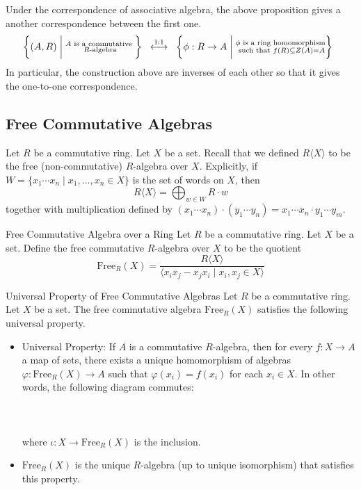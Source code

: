 \documentclass[a4paper]{article}
\begin{document}
Under the correspondence of associative algebra, the above proposition gives a another correspondence between the first one. $$\left\{(A,R)\;\bigg{|}\;\substack{A\text{ is a commutative }\\R\text{-algebra}}\right\}\;\;\overset{1:1}{\longleftrightarrow}\;\;\left\{\phi:R\to A\;\bigg{|}\;\substack{\phi\text{ is a ring homomorphism}\\\text{ such that }f(R)\subseteq Z(A)=A}\right\}\;\;$$ In particular, the construction above are inverses of each other so that it gives the one-to-one correspondence. 

\subsection{Free Commutative Algebras}
Let $R$ be a commutative ring. Let $X$ be a set. Recall that we defined $R\langle X\rangle$ to be the free (non-commutative) $R$-algebra over $X$. Explicitly, if $W=\{x_1\cdots x_n\;|\;x_1,\dots,x_n\in X\}$ is the set of words on $X$, then $$R\langle X\rangle=\bigoplus_{w\in W}R\cdot w$$ together with multiplication defined by $(x_1\cdots x_n)\cdot(y_1\cdots y_n)=x_1\cdots x_n\cdot y_1\cdots y_m$. 

\begin{defn}{Free Commutative Algebra over a Ring}{} Let $R$ be a commutative ring. Let $X$ be a set. Define the free commutative $R$-algebra over $X$ to be the quotient $$\text{Free}_R(X)=\frac{R\langle X\rangle}{\langle x_ix_j-x_jx_i\;|\;x_i,x_j\in X\rangle}$$
\end{defn}

\begin{prp}{Universal Property of Free Commutative Algebras}{} Let $R$ be a commutative ring. Let $X$ be a set. The free commutative algebra $\text{Free}_R(X)$ satisfies the following universal property. 
\begin{itemize}
\item Universal Property: If $A$ is a commutative $R$-algebra, then for every $f:X\to A$ a map of sets, there exists a unique homomorphism of algebras $\varphi:\text{Free}_R(X)\to A$ such that $\varphi(x_i)=f(x_i)$ for each $x_i\in X$. In other words, the following diagram commutes: \\~\\
\\~\\
where $\iota:X\to\text{Free}_R(X)$ is the inclusion. 
\item $\text{Free}_R(X)$ is the unique $R$-algebra (up to unique isomorphism) that satisfies this property. 
\end{itemize}
\end{prp}
\end{document}
